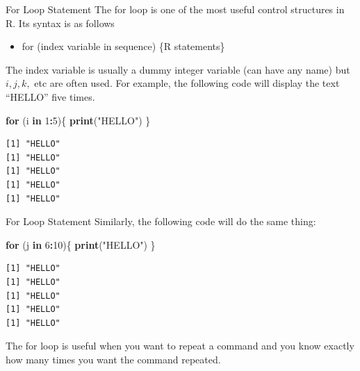 \documentclass[
  ignorenonframetext,
]{beamer}
\newenvironment{Shaded}{\begin{snugshade}}{\end{snugshade}}
\newcommand{\ControlFlowTok}[1]{\textcolor[rgb]{0.13,0.29,0.53}{\textbf{#1}}}
\newcommand{\DecValTok}[1]{\textcolor[rgb]{0.00,0.00,0.81}{#1}}
\newcommand{\FunctionTok}[1]{\textcolor[rgb]{0.13,0.29,0.53}{\textbf{#1}}}
\newcommand{\NormalTok}[1]{#1}
\newcommand{\SpecialCharTok}[1]{\textcolor[rgb]{0.81,0.36,0.00}{\textbf{#1}}}
\newcommand{\StringTok}[1]{\textcolor[rgb]{0.31,0.60,0.02}{#1}}
\providecommand{\tightlist}{%
  \setlength{\itemsep}{0pt}\setlength{\parskip}{0pt}}
\begin{document}
\begin{frame}[fragile]{For Loop Statement}
\label{for-loop-statement}
The for loop is one of the most useful control structures in R. Its
syntax is as follows

\begin{itemize}
\tightlist
\item
  for (index variable in sequence) \{R statements\}
\end{itemize}

The index variable is usually a dummy integer variable (can have any
name) but \(i, j, k,\) etc are often used. For example, the following
code will display the text ``HELLO'' five times.

\small

\begin{Shaded}
\begin{Highlighting}[]
\ControlFlowTok{for}\NormalTok{ (i }\ControlFlowTok{in} \DecValTok{1}\SpecialCharTok{:}\DecValTok{5}\NormalTok{)\{ }
  \FunctionTok{print}\NormalTok{(}\StringTok{"HELLO"}\NormalTok{) }
\NormalTok{\}}
\end{Highlighting}
\end{Shaded}

\begin{verbatim}
[1] "HELLO"
[1] "HELLO"
[1] "HELLO"
[1] "HELLO"
[1] "HELLO"
\end{verbatim}

\normalsize
\end{frame}

\begin{frame}[fragile]{For Loop Statement}
\label{for-loop-statement-1}
Similarly, the following code will do the same thing:

\small

\begin{Shaded}
\begin{Highlighting}[]
\ControlFlowTok{for}\NormalTok{ (j }\ControlFlowTok{in} \DecValTok{6}\SpecialCharTok{:}\DecValTok{10}\NormalTok{)\{}
  \FunctionTok{print}\NormalTok{(}\StringTok{"HELLO"}\NormalTok{)}
\NormalTok{\}}
\end{Highlighting}
\end{Shaded}

\begin{verbatim}
[1] "HELLO"
[1] "HELLO"
[1] "HELLO"
[1] "HELLO"
[1] "HELLO"
\end{verbatim}

\normalsize

The for loop is useful when you want to repeat a command and you know
exactly how many times you want the command repeated.
\end{frame}
\end{document}
